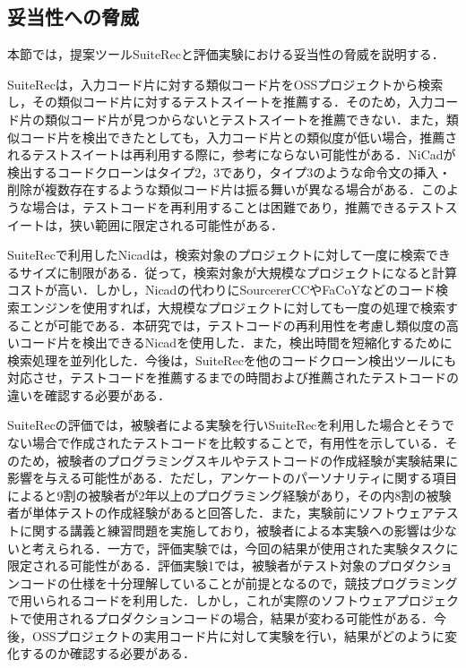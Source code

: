 \documentclass[12pt]{jarticle} %
\begin{document}
\subsection{妥当性への脅威}

本節では，提案ツール{\sf SuiteRec}と評価実験における妥当性の脅威を説明する．

{\sf SuiteRec}は，入力コード片に対する類似コード片をOSSプロジェクトから検索し，その類似コード片に対するテストスイートを推薦する．そのため，入力コード片の類似コード片が見つからないとテストスイートを推薦できない．また，類似コード片を検出できたとしても，入力コード片との類似度が低い場合，推薦されるテストスイートは再利用する際に，参考にならない可能性がある．{\sf NiCad}が検出するコードクローンはタイプ2，3であり，タイプ3のような命令文の挿入・削除が複数存在するような類似コード片は振る舞いが異なる場合がある．このような場合は，テストコードを再利用することは困難であり，推薦できるテストスイートは，狭い範囲に限定される可能性がある．

{\sf SuiteRec}で利用した{\sf Nicad}は，検索対象のプロジェクトに対して一度に検索できるサイズに制限がある．従って，検索対象が大規模なプロジェクトになると計算コストが高い．しかし，{\sf Nicad}の代わりに{\sf SourcererCC}\cite{SourcererCC}や{\sf FaCoY}\cite{FaCoY}などのコード検索エンジンを使用すれば，大規模なプロジェクトに対しても一度の処理で検索することが可能である．本研究では，テストコードの再利用性を考慮し類似度の高いコード片を検出できる{\sf Nicad}を使用した．また，検出時間を短縮化するために検索処理を並列化した．今後は，{\sf SuiteRec}を他のコードクローン検出ツールにも対応させ，テストコードを推薦するまでの時間および推薦されたテストコードの違いを確認する必要がある．

{\sf SuiteRec}の評価では，被験者による実験を行い{\sf SuiteRec}を利用した場合とそうでない場合で作成されたテストコードを比較することで，有用性を示している．そのため，被験者のプログラミングスキルやテストコードの作成経験が実験結果に影響を与える可能性がある．ただし，アンケートのパーソナリティに関する項目によると9割の被験者が2年以上のプログラミング経験があり，その内8割の被験者が単体テストの作成経験があると回答した．また，実験前にソフトウェアテストに関する講義と練習問題を実施しており，被験者による本実験への影響は少ないと考えられる．一方で，評価実験では，今回の結果が使用された実験タスクに限定される可能性がある．評価実験1では，被験者がテスト対象のプロダクションコードの仕様を十分理解していることが前提となるので，競技プログラミングで用いられるコードを利用した．しかし，これが実際のソフトウェアプロジェクトで使用されるプロダクションコードの場合，結果が変わる可能性がある．今後，OSSプロジェクトの実用コード片に対して実験を行い，結果がどのように変化するのか確認する必要がある．
\end{document}
